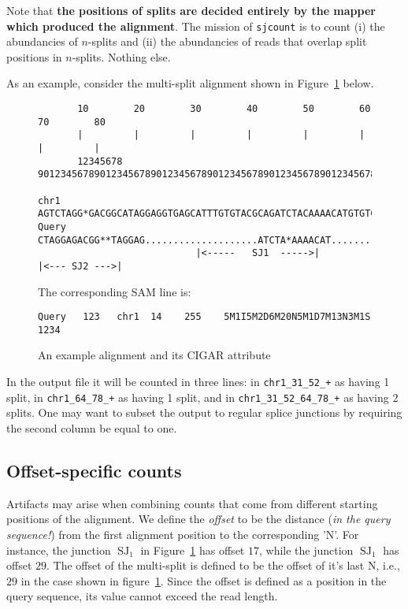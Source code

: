 \documentclass{article}
\DeclareMathOperator{\SJ}{SJ}
\begin{document}
Note that {\bf the positions of splits are decided entirely by the mapper which produced the alignment}. The mission of 
{\tt sjcount}  is to count (i) the abundancies of $n$-splits and (ii) the abundancies of reads that overlap split 
positions in $n$-splits. Nothing else.

As an example, consider the multi-split alignment shown in Figure~\ref{fig::01} below. 
%
\begin{figure}[h]
\footnotesize
\begin{verbatim}
       10        20        30        40        50        60        70        80
       |         |         |         |         |         |         |         |
       12345678 9012345678901234567890123456789012345678901234567890123456789012

chr1   AGTCTAGG*GACGGCATAGGAGGTGAGCATTTGTGTACGCAGATCTACAAAACATGTGTCACGGATAGGATCG
Query     CTAGGAGACGG**TAGGAG....................ATCTA*AAAACAT.............GATa
                            |<-----   SJ1  ----->|           |<--- SJ2 --->|
\end{verbatim}
The corresponding SAM line is:
\begin{verbatim}
Query   123   chr1  14    255    5M1I5M2D6M20N5M1D7M13N3M1S 1234 
\end{verbatim}
\caption{An example alignment and its CIGAR attribute\label{fig::01}}
\end{figure}
%
In the output file it will be counted in three lines: in {\tt chr1\_31\_52\_+} as having 1 split, 
in {\tt chr1\_64\_78\_+} as having 1 split, and in {\tt chr1\_31\_52\_64\_78\_+} as having 2 splits.
One may want to subset the output to regular splice junctions by requiring the second column be 
equal to one.

\subsection{Offset-specific counts}
Artifacts may arise when combining counts that come from different starting positions of the alignment. We 
define the {\em offset} to be the distance ({\em in the query sequence!}) from the first alignment position 
to the corresponding 'N'. For instance, the junction $\SJ_1$ in Figure~\ref{fig::01} has offset $17$, while
the junction $\SJ_1$ has offset $29$. The offset of the multi-split is defined to be the offset of it's last 
N, i.e., $29$ in the case shown in figure~\ref{fig::01}. Since the offset is defined as a position in the query 
sequence, its value cannot exceed the read length.
\end{document}
